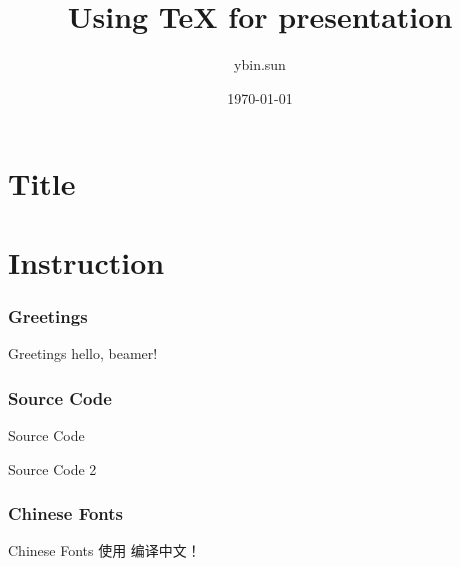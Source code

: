 ﻿\documentclass{beamer}
\title{Using \TeX{} for presentation}
\author{ybin.sun}
\institute{\texttt{ybin.sun@gmail.com}}
\date{\today}
\begin{document}


\part[Title]{Title}
\begin{frame}[plain]
  \titlepage
\end{frame}


\part[Instruction]{Instruction}
\section[Greetings]{Greetings}
\begin{frame}{Greetings}
hello, beamer!
\end{frame}

\section[Source Code]{Source Code}
\begin{frame}{Source Code}

\end{frame}

\begin{frame}{Source Code 2}
  
\end{frame}


\section[Chinese Fonts]{Chinese Fonts}
\begin{frame}{Chinese Fonts}
使用 \XeTeX{} 编译中文！
\end{frame}
\end{document}

